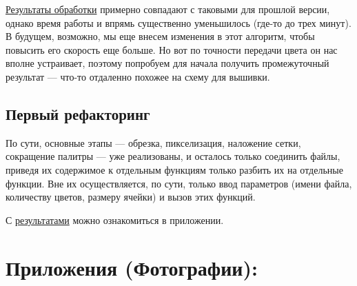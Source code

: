 \documentclass[12pt]{article}
\begin{document}
{	
	
	\hyperref[reduced_clasters_hex_cats]{Результаты обработки} примерно совпадают с таковыми для прошлой версии, однако время работы и впрямь существенно уменьшилось (где-то до трех минут). В будущем, возможно, мы еще внесем изменения в этот алгоритм, чтобы повысить его скорость еще больше. Но вот по точности передачи цвета он нас вполне устраивает, поэтому попробуем для начала получить промежуточный результат --- что-то отдаленно похожее на схему для вышивки. 
	
	\subsection{Первый рефакторинг}
	
	По сути, основные этапы --- обрезка, пикселизация, наложение сетки, сокращение палитры --- уже реализованы, и осталось только соединить файлы, приведя их содержимое к отдельным функциям только разбить их на отдельные функции. Вне их осуществляется, по сути, только ввод параметров (имени файла, количеству цветов, размеру ячейки) и вызов этих функций.
	
	
	 
	С \hyperref[refactoring1_cats]{результатами} можно ознакомиться в приложении. 
	
	\section{Приложения (Фотографии):}
	\label{assets}
	
	\begin{figure}[bh]
		\noindent{}
	\end{figure}
	\label{cats}

}
\end{document}
